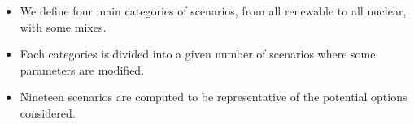 \begin{kaoboxgreen}[frametitle=Main Takeaways]

\begin{itemize}
\item We define four main categories of scenarios, from all renewable to all nuclear, with some mixes.
\item Each categories is divided into a given number of scenarios where some parameters are modified.
\item Nineteen scenarios are computed to be representative of the potential options considered.
\end{itemize}
  
\end{kaoboxgreen}
























